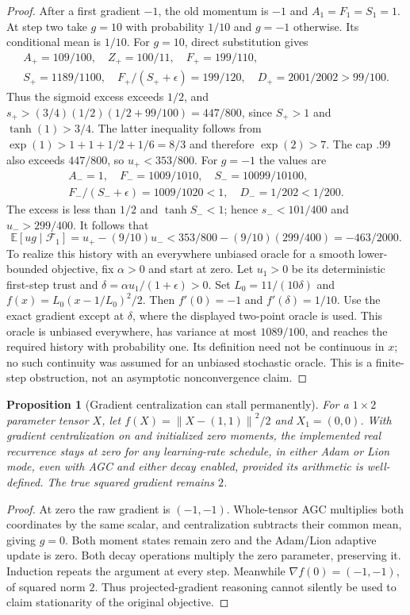 \documentclass[11pt]{article}
\newtheorem{proposition}[theorem]{Proposition}
\theoremstyle{definition}
\theoremstyle{remark}
\newcommand{\E}{\mathbb E}
\newcommand{\norm}[1]{\left\lVert#1\right\rVert}
\begin{document}
\begin{proof}
After a first gradient $-1$, the old momentum is $-1$ and $A_1=F_1=S_1=1$.
At step two take $g=10$ with probability $1/10$ and $g=-1$ otherwise.
Its conditional mean is $1/10$. For $g=10$, direct substitution gives
\[
\begin{gathered}
 A_+=109/100,\quad Z_+=100/11,\quad F_+=199/110,\\
 S_+=1189/1100,\quad F_+/(S_++\epsilon)=199/120,\quad
 D_+=2001/2002>99/100.
\end{gathered}
\]
Thus the sigmoid excess exceeds $1/2$, and
$s_+>(3/4)(1/2)(1/2+99/100)=447/800$, since $S_+>1$ and
$\tanh(1)>3/4$. The latter inequality follows from
$\exp(1)>1+1+1/2+1/6=8/3$ and therefore $\exp(2)>7$.
The cap $.99$ also exceeds $447/800$, so $u_+<353/800$.
For $g=-1$ the values are
\[
\begin{gathered}
 A_-=1,\quad F_-=1009/1010,\quad S_-=10099/10100,\\
 F_-/(S_-+\epsilon)=1009/1020<1,\quad D_-=1/202<1/200.
\end{gathered}
\]
The excess is less than $1/2$ and $\tanh S_-<1$; hence
$s_-<101/400$ and $u_->299/400$. It follows that
\[
 \E[ug\mid\mathcal F_1]=u_+-(9/10)u_-
 <353/800-(9/10)(299/400)=-463/2000.
\]
To realize this history with an everywhere unbiased oracle for a smooth
lower-bounded objective, fix $\alpha>0$ and start at zero. Let $u_1>0$ be its deterministic
first-step trust and $\delta=\alpha u_1/(1+\epsilon)>0$.
Set $L_0=11/(10\delta)$ and $f(x)=L_0(x-1/L_0)^2/2$.
Then $f'(0)=-1$ and $f'(\delta)=1/10$. Use the exact gradient except at
$\delta$, where the displayed two-point oracle is used. This oracle is
unbiased everywhere, has variance at most $1089/100$, and reaches the required
history with probability one. Its definition need not be continuous in $x$;
no such continuity was assumed for an unbiased stochastic oracle.
This is a finite-step obstruction, not an asymptotic nonconvergence claim.
\end{proof}

\begin{proposition}[Gradient centralization can stall permanently]\label{prop:gc}
For a $1\times2$ parameter tensor $X$, let
$f(X)=\norm{X-(1,1)}^2/2$ and $X_1=(0,0)$. With gradient centralization
on and initialized zero moments, the implemented real recurrence stays at
zero for any learning-rate schedule, in either Adam or Lion mode, even with
AGC and either decay enabled, provided its arithmetic is well-defined.
The true squared gradient remains $2$.
\end{proposition}
\begin{proof}
At zero the raw gradient is $(-1,-1)$. Whole-tensor AGC multiplies both
coordinates by the same scalar, and centralization subtracts their common
mean, giving $g=0$. Both moment states remain zero and the Adam/Lion adaptive
update is zero. Both decay operations multiply the zero parameter, preserving
it. Induction repeats the argument at every step. Meanwhile
$\nabla f(0)=(-1,-1)$, of squared norm $2$. Thus projected-gradient reasoning
cannot silently be used to claim stationarity of the original objective.
\end{proof}
\end{document}
